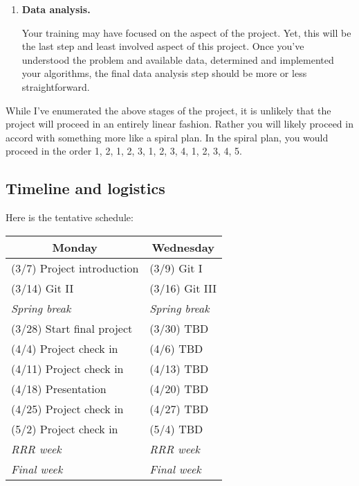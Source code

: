 \documentclass[11pt, oneside]{article}   	%
\begin{document}
\begin{enumerate}
\item \textbf{Data analysis.}

Your training may have focused on the aspect of the project.  Yet, this will be
the last step and least involved aspect of this project.  Once you've
understood the problem and available data, determined and implemented your
algorithms, the final data analysis step should be more or less
straightforward.

\end{enumerate}

While I've enumerated the above stages of the project, it is unlikely that the
project will proceed in an entirely linear fashion.  Rather you will likely
proceed in accord with something more like a spiral plan.  In the spiral plan,
you would proceed in the order 1, 2, 1, 2, 3, 1, 2, 3, 4, 1, 2, 3, 4, 5.

\subsection*{Timeline and logistics}

Here is the tentative schedule:

\begin{table}[h]
\centering
\begin{tabular}{@{}l|l@{}}
\toprule
\multicolumn{1}{c|}{Monday} & \multicolumn{1}{c}{Wednesday} \\
\hline
(3/7) Project introduction     & (3/9) Git I \\
(3/14) Git II                  & (3/16) Git III \\
\emph{\hspace{12mm} Spring break}  & \emph{\hspace{12mm} Spring break}\\
(3/28) Start final project     & (3/30) TBD\\
(4/4) Project check in         & (4/6) TBD\\
(4/11) Project check in        & (4/13) TBD\\
(4/18) Presentation            & (4/20) TBD\\
(4/25) Project check in        & (4/27) TBD\\
(5/2) Project check in         & (5/4) TBD\\
\emph{\hspace{12mm} RRR week}  & \emph{\hspace{12mm} RRR week}\\
\emph{\hspace{12mm} Final week}  & \emph{\hspace{12mm} Final week}\\
\bottomrule
\end{tabular}
\end{table}
\end{document}
